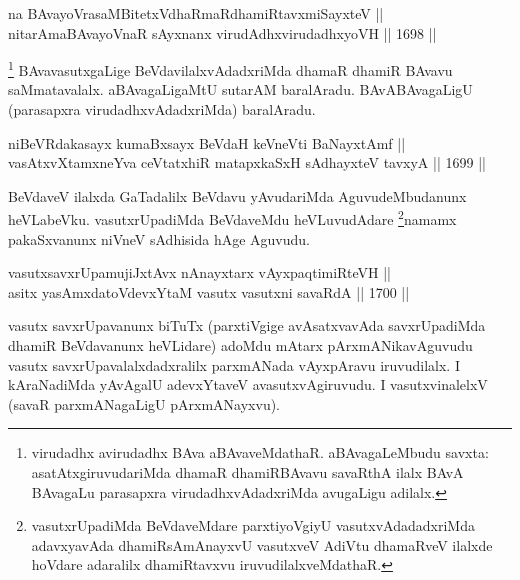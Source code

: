 
\begin{shl}
na BAvayoVrasaMBitetxVdhaRmaRdhamiRtavxmiSayxteV || \\
nitarAmaBAvayoVnaR sAyxnanx virudAdhxvirudadhxyoVH \hfill || 1698 ||  
\end{shl}

\begin{artha}
\footnote{virudadhx avirudadhx BAva aBAvaveMdathaR. aBAvagaLeMbudu savxta: asatAtxgiruvudariMda dhamaR dhamiRBAvavu savaRthA ilalx BAvA BAvagaLu parasapxra virudadhxvAdadxriMda avugaLigu adilalx.}
BAvavasutxgaLige BeVdavilalxvAdadxriMda dhamaR dhamiR BAvavu saMmatavalalx. aBAvagaLigaMtU sutarAM baralAradu. BAvABAvagaLigU (parasapxra virudadhxvAdadxriMda) baralAradu.
\end{artha}

\begin{shl}
niBeVRdakasayx kumaBxsayx BeVdaH keVneVti BaNayxtAmf || \\
vasAtxvXtamxneYva ceVtatxhiR matapxkaSxH sAdhayxteV tavxyA \hfill || 1699 ||  
\end{shl}

\begin{artha}
BeVdaveV ilalxda GaTadalilx BeVdavu yAvudariMda AguvudeMbudanunx heVLabeVku. vasutxrUpadiMda BeVdaveMdu heVLuvudAdare \footnote{vasutxrUpadiMda BeVdaveMdare parxtiyoVgiyU vasutxvAdadadxriMda adavxyavAda dhamiRsAmAnayxvU vasutxveV AdiVtu dhamaRveV ilalxde hoVdare adaralilx dhamiRtavxvu iruvudilalxveMdathaR.}namamx pakaSxvanunx niVneV sAdhisida hAge Aguvudu.
\end{artha}

\begin{shl}
vasutxsavxrUpamujiJxtAvx nAnayxtarx vAyxpaqtimiRteVH || \\
asitx yasAmxdatoV\s devxYtaM vasutx vasutxni savaRdA \hfill || 1700 ||  
\end{shl}

\begin{artha}
vasutx savxrUpavanunx biTuTx (parxtiVgige avAsatxvavAda savxrUpadiMda dhamiR BeVdavanunx heVLidare) adoMdu mAtarx pArxmANikavAguvudu vasutx savxrUpavalalxdadxralilx parxmANada vAyxpAravu iruvudilalx. I kAraNadiMda yAvAgalU adevxYtaveV avasutxvAgiruvudu. I vasutxvinalelxV (savaR parxmANagaLigU pArxmANayxvu).
\end{artha}

